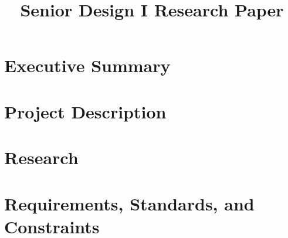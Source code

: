 \documentclass[12pt, letterpaper]{article}
\title{Senior Design I Research Paper}
\begin{document}
	\sloppy %
	
	\begin{singlespace}
		
	
		\tableofcontents
		\newpage
		\listoffigures
		\newpage
		\listoftables
		\setcounter{secnumdepth}{3}
	
		\newpage
		\section{Executive Summary}
		
		
		\newpage
		\section{Project Description}
		
		
		
		
		
		
		
		\newpage
		\section{Research}
		
		
		
		
		
		
		\newpage
		\section{Requirements, Standards, and Constraints}
		
		
		
		
		
		
	

\end{singlespace}
\end{document}
